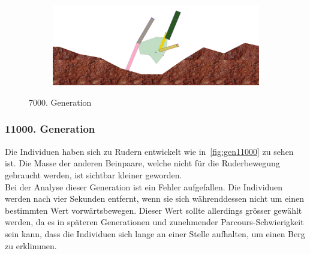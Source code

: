 \begin{figure}[H]
\begin{subfigure}[b]{0.45\textwidth}
            \includegraphics[width=\linewidth,center]{graphics/simulation-results/4_gen7000_4}
            \caption{\label{fig:gen7000_4}}
          \end{subfigure}
          \caption{7000. Generation\label{fig:gen7000}}
        \end{figure}

      \subsubsection{11000. Generation}

        Die Individuen haben sich zu Rudern entwickelt wie in~\vref{fig:gen11000} zu sehen ist.
        Die Masse der anderen Beinpaare, welche nicht für die Ruderbewegung gebraucht werden,
        ist sichtbar kleiner geworden.
        \\
        Bei der Analyse dieser Generation ist ein Fehler aufgefallen.
        Die Individuen werden nach vier Sekunden entfernt,
        wenn sie sich währenddessen nicht um einen bestimmten Wert vorwärtsbewegen.
        Dieser Wert sollte allerdings grösser gewählt werden,
        da es in späteren Generationen und zunehmender Parcours-Schwierigkeit sein kann,
        dass die Individuen sich lange an einer Stelle aufhalten, um einen Berg zu erklimmen.


